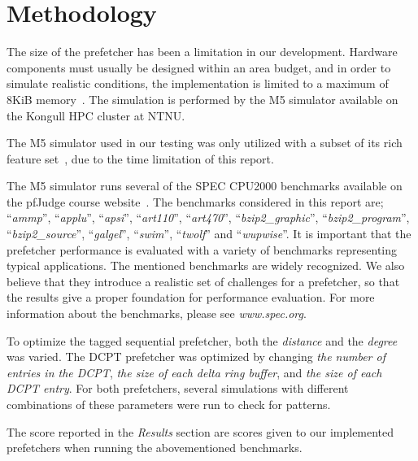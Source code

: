 \section{Methodology}

The size of the prefetcher has been a limitation in our development. Hardware
components must usually be designed within an area budget, and in order to
simulate realistic conditions, the implementation is limited to a maximum of
8KiB memory~\cite{guidelines}. The simulation is performed by the M5 simulator
available on the Kongull HPC cluster at NTNU.

The M5 simulator used in our testing was only utilized with a subset of its rich
feature set~\cite{user_doc}, due to the time limitation of this report.



The M5 simulator runs several of the SPEC CPU2000 benchmarks available on the
pfJudge course website~\cite{guidelines}. The benchmarks considered in this report are;
``\emph{ammp}'', ``\emph{applu}'', ``\emph{apsi}'', ``\emph{art110}'',
``\emph{art470}'', ``\emph{bzip2\_graphic}'', ``\emph{bzip2\_program}'',
``\emph{bzip2\_source}'', ``\emph{galgel}'', ``\emph{swim}'', ``\emph{twolf}'' and
``\emph{wupwise}''. It is important that the prefetcher performance is 
evaluated with a variety of benchmarks representing typical applications. 
The mentioned benchmarks are widely recognized. We also believe that they 
introduce a realistic set of challenges for a prefetcher, so that the results give a 
proper foundation for performance evaluation.
For more information about the benchmarks, please see \emph{www.spec.org}.

To optimize the tagged sequential prefetcher, both the \emph{distance} and 
the \emph{degree} was varied. The DCPT prefetcher was optimized by changing 
\emph{the number of entries in the DCPT}, \emph{the size of each delta 
ring buffer}, and \emph{the size of each DCPT entry}. For both prefetchers, several 
simulations with different combinations of these parameters were run to check for patterns.


The score reported in the \textit{Results} section are scores given to our
implemented prefetchers when running the abovementioned benchmarks.

